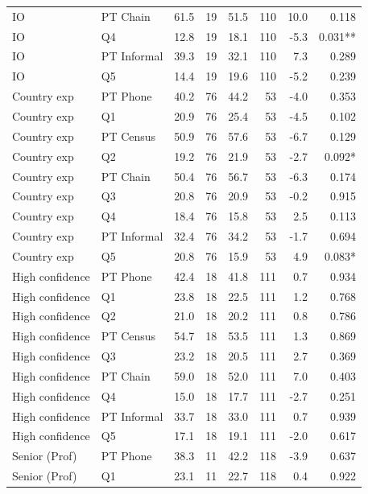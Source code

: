 \begin{tabular}{llrrrrrr}
IO & PT Chain &  61.5 &   19 &  51.5 &  110 &  10.0 &  0.118 \\
IO & Q4 &  12.8 &   19 &  18.1 &  110 &  -5.3 &  0.031** \\
IO & PT Informal &  39.3 &   19 &  32.1 &  110 &   7.3 &  0.289 \\
IO & Q5 &  14.4 &   19 &  19.6 &  110 &  -5.2 &  0.239 \\
Country exp & PT Phone &  40.2 &   76 &  44.2 &   53 &  -4.0 &  0.353 \\
Country exp & Q1 &  20.9 &   76 &  25.4 &   53 &  -4.5 &  0.102 \\
Country exp & PT Census &  50.9 &   76 &  57.6 &   53 &  -6.7 &  0.129 \\
Country exp & Q2 &  19.2 &   76 &  21.9 &   53 &  -2.7 &  0.092* \\
Country exp & PT Chain &  50.4 &   76 &  56.7 &   53 &  -6.3 &  0.174 \\
Country exp & Q3 &  20.8 &   76 &  20.9 &   53 &  -0.2 &  0.915 \\
Country exp & Q4 &  18.4 &   76 &  15.8 &   53 &   2.5 &  0.113 \\
Country exp & PT Informal &  32.4 &   76 &  34.2 &   53 &  -1.7 &  0.694 \\
Country exp & Q5 &  20.8 &   76 &  15.9 &   53 &   4.9 &  0.083* \\
High confidence & PT Phone &  42.4 &   18 &  41.8 &  111 &   0.7 &  0.934 \\
High confidence & Q1 &  23.8 &   18 &  22.5 &  111 &   1.2 &  0.768 \\
High confidence & Q2 &  21.0 &   18 &  20.2 &  111 &   0.8 &  0.786 \\
High confidence & PT Census &  54.7 &   18 &  53.5 &  111 &   1.3 &  0.869 \\
High confidence & Q3 &  23.2 &   18 &  20.5 &  111 &   2.7 &  0.369 \\
High confidence & PT Chain &  59.0 &   18 &  52.0 &  111 &   7.0 &  0.403 \\
High confidence & Q4 &  15.0 &   18 &  17.7 &  111 &  -2.7 &  0.251 \\
High confidence & PT Informal &  33.7 &   18 &  33.0 &  111 &   0.7 &  0.939 \\
High confidence & Q5 &  17.1 &   18 &  19.1 &  111 &  -2.0 &  0.617 \\
Senior (Prof) & PT Phone &  38.3 &   11 &  42.2 &  118 &  -3.9 &  0.637 \\
Senior (Prof) & Q1 &  23.1 &   11 &  22.7 &  118 &   0.4 &  0.922 \\

\end{tabular}
